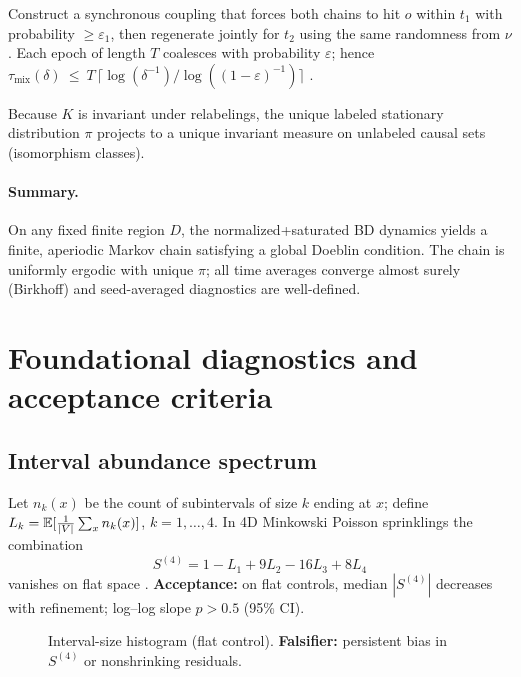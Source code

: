 \begin{remark}
Construct a synchronous coupling that forces both chains to hit $o$ within $t_1$ with probability $\ge\varepsilon_1$, then regenerate jointly for $t_2$ using the same randomness from $\nu$. Each epoch of length $T$ coalesces with probability $\varepsilon$; hence
$\tau_{\mathrm{mix}}(\delta)\ \le\ T\,\lceil \log(\delta^{-1})/\log((1-\varepsilon)^{-1})\rceil$ \cite{LevinPeresWilmer2009}.
\end{remark}

\begin{proposition}
Because $K$ is invariant under relabelings, the unique labeled stationary distribution $\pi$ projects to a unique invariant measure on unlabeled causal sets (isomorphism classes).
\end{proposition}

\paragraph{Summary.} On any fixed finite region $D$, the normalized+saturated BD dynamics yields a finite, aperiodic Markov chain satisfying a global Doeblin condition. The chain is uniformly ergodic with unique $\pi$; all time averages converge almost surely (Birkhoff) and seed-averaged diagnostics are well-defined.

\section{Foundational diagnostics and acceptance criteria}

\subsection{Interval abundance spectrum}
Let $n_k(x)$ be the count of subintervals of size $k$ ending at $x$; define $L_k=\mathbb{E}[\tfrac{1}{|V|}\sum_x n_k(x)]$, $k=1,\dots,4$. In 4D Minkowski Poisson sprinklings the combination
\[
S^{(4)}=1-L_1+9L_2-16L_3+8L_4
\]
vanishes on flat space \citep{BenincasaDowker2010}. \textbf{Acceptance:} on flat controls, median $|S^{(4)}|$ decreases with refinement; log–log slope $p>0.5$ (95\% CI).

\begin{figure}[H]\centering
{}
\caption{Interval-size histogram (flat control). \textbf{Falsifier:} persistent bias in $S^{(4)}$ or nonshrinking residuals.}
\end{figure}

